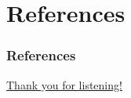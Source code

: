 \documentclass{beamer}
\theoremstyle{plain}
\theoremstyle{definition}
\DeclarePairedDelimiter{\abs}{\lvert}{\rvert}
\newcommand{\mathcat}[1]{\mathcal{#1}}
\newcommand{\Ob}{\textup{Ob}}
\newcommand{\textcat}[1]{\textup{\textsf{#1}}}
\newcommand{\rmodcat}[2][]{\textcat{Mod}_{#1}\textcat{-}#2}
\newcommand{\Irr}{\textup{Irr}}
\newcommand{\FPdim}{\textup{FPdim}}
\begin{document}



\section*{References}

\begin{frame}[allowframebreaks]
\frametitle{References}
\footnotesize{
\printbibliography[heading = none]
}
\end{frame}


\begin{frame}
\centerline{\Huge\textcolor{structure}{\underline{Thank you for listening!}}}
\end{frame}
\end{document}
